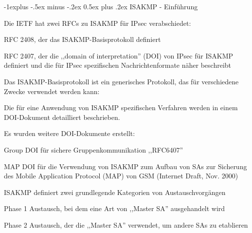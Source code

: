 \documentclass[a4paper]{article}
\makeatletter
\renewcommand{\subsection}{\@startsection{subsection}{2}{0mm}%
 {-1explus -.5ex minus -.2ex}%
 {0.5ex plus .2ex}%
 {\normalfont\normalsize\bfseries}}
\makeatother
\begin{document}
\begin{multicols}{3}
      \subsection{ISAKMP - Einführung}
      \begin{itemize*}
            \item Die IETF hat zwei RFCs zu ISAKMP für IPsec verabschiedet:
            \begin{itemize*}
                  \item RFC 2408, der das ISAKMP-Basisprotokoll definiert
                  \item RFC 2407, der die ,,domain of interpretation'' (DOI) von IPsec für ISAKMP definiert und die für IPsec spezifischen Nachrichtenformate näher beschreibt
            \end{itemize*}
            \item Das ISAKMP-Basisprotokoll ist ein generisches Protokoll, das für verschiedene Zwecke verwendet werden kann:
            \begin{itemize*}
                  \item Die für eine Anwendung von ISAKMP spezifischen Verfahren werden in einem DOI-Dokument detailliert beschrieben.
                  \item Es wurden weitere DOI-Dokumente erstellt:
                  \begin{itemize*}
                        \item Group DOI für sichere Gruppenkommunikation ,,RFC6407''
                        \item MAP DOI für die Verwendung von ISAKMP zum Aufbau von SAs zur Sicherung des Mobile Application Protocol (MAP) von GSM (Internet Draft, Nov. 2000)
                  \end{itemize*}
            \end{itemize*}
            \item ISAKMP definiert zwei grundlegende Kategorien von Austauschvorgängen
            \begin{itemize*}
                  \item Phase 1 Austausch, bei dem eine Art von ,,Master SA'' ausgehandelt wird
                  \item Phase 2 Austausch, der die ,,Master SA'' verwendet, um andere SAs zu etablieren
            \end{itemize*}
      \end{itemize*}


\end{multicols}
\end{document}
